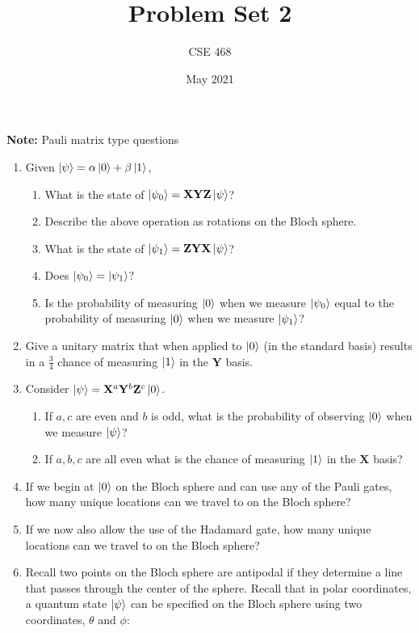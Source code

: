 \documentclass[12pt]{article}
\title{Problem Set 2}
\author{CSE 468}
\date{May 2021}
\begin{document}
\maketitle

\noindent \textbf{Note:} Pauli matrix type questions

\begin{enumerate}[font=\bfseries]
    \item Given $\ket{\psi} = \alpha\ket{0} + \beta\ket{1}$,
    \begin{enumerate}
        \item What is the state of $\ket{\psi_0} = \mathbf{X}\mathbf{Y}\mathbf{Z}\ket{\psi}$?
        \item Describe the above operation as rotations on the Bloch sphere.
        \item What is the state of $\ket{\psi_1} = \mathbf{Z}\mathbf{Y}\mathbf{X}\ket{\psi}$?
        \item Does $\ket{\psi_0} = \ket{\psi_1}$?
        \item Is the probability of measuring $\ket{0}$ when we measure $\ket{\psi_0}$ equal to the probability of measuring $\ket{0}$ when we measure $\ket{\psi_1}$?
    \end{enumerate}
    \item Give a unitary matrix that when applied to $\ket{0}$ (in the standard basis) results in a $\frac{3}{4}$ chance of measuring $\ket{1}$ in the $\mathbf{Y}$ basis. 
    \item Consider $\ket{\psi} = \mathbf{X}^a\mathbf{Y}^b\mathbf{Z}^c\ket{0}$.
    \begin{enumerate}
        \item If $a,c$ are even and $b$ is odd, what is the probability of observing $\ket{0}$ when we measure $\ket{\psi}$?
        \item If $a,b,c$ are all even what is the chance of measuring $\ket{1}$ in the $\mathbf{X}$ basis?
    \end{enumerate}
    \item If we begin at $\ket{0}$ on the Bloch sphere and can use any of the Pauli gates, how many unique locations can we travel to on the Bloch sphere?
    \item If we now also allow the use of the Hadamard gate, how many unique locations can we travel to on the Bloch sphere?
    \item Recall two points on the Bloch sphere are antipodal if they determine a line that passes through the center of the sphere. Recall that in polar coordinates, a quantum state $\ket{\psi}$ can be specified on the Bloch sphere using two coordinates, $\theta$ and $\phi$:

\end{enumerate}
\end{document}
